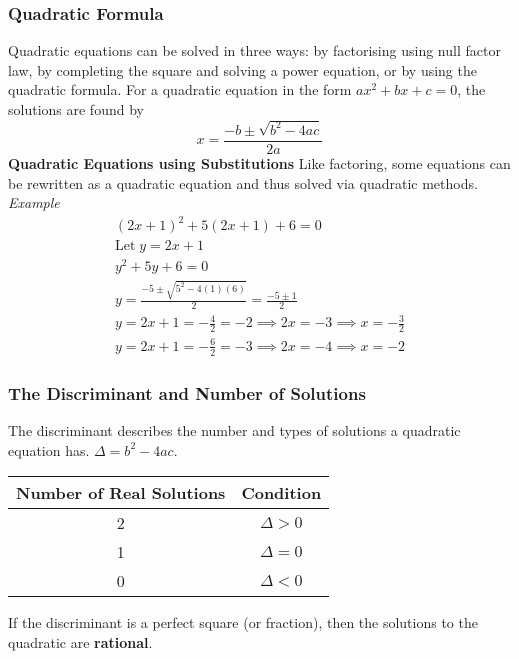 \documentclass{article}
\begin{document}
			\subsubsection{Quadratic Formula}
				Quadratic equations can be solved in three ways: by factorising using null factor law, by completing the square and solving a power equation, or by using the quadratic formula.\newline\newline
				For a quadratic equation in the form $ax^2+bx+c=0$, the solutions are found by
				\[x=\frac{-b\pm\sqrt{b^2-4ac}}{2a}\]
				\textbf{Quadratic Equations using Substitutions}\newline
				Like factoring, some equations can be rewritten as a quadratic equation and thus solved via quadratic methods.\newline\newline
				\textit{Example}\newline
				\begin{align*}
					(2x+1)^2+5(2x+1)+6=0 \\
					\text{Let}\;y=2x+1 \\
					y^2+5y+6=0 \\
					y=\frac{-5\pm\sqrt{5^2-4(1)(6)}}{2}=\frac{-5\pm 1}{2} \\
					y=2x+1=-\frac{4}{2}=-2\implies2x=-3\implies x=-\frac{3}{2} \\
					y=2x+1=-\frac{6}{2}=-3\implies2x=-4\implies x=-2
				\end{align*}
			\subsubsection{The Discriminant and Number of Solutions}
				The discriminant describes the number and types of solutions a quadratic equation has. $\Delta=b^2-4ac$.\newline
				\bgroup
				\def\arraystretch{1.5}
				\begin{center}
					\begin{tabular}{|c|c|}
						\hline
						Number of Real Solutions & Condition \\
						\hline
						2 & $\Delta>0$ \\
						\hline
						1 & $\Delta=0$ \\
						\hline
						0 & $\Delta<0$ \\
						\hline
					\end{tabular}
				\end{center}
				\egroup
				\noindent If the discriminant is a perfect square (or fraction), then the solutions to the quadratic are \textbf{rational}.
\end{document}

